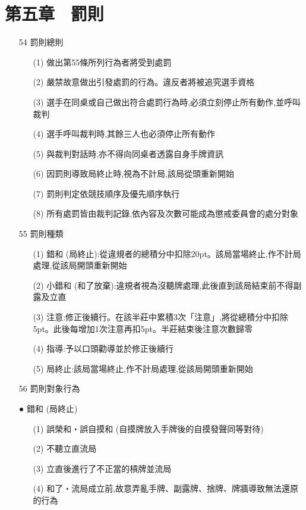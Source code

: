 \documentclass[a4paper,12pt]{article}
\begin{document}
\section*{第五章 \ 罰則}
\begin{itemize}
    \item[54] 罰則總則
    \begin{itemize}
        \item[(1)] 做出第55條所列行為者將受到處罰
        \item[(2)] 嚴禁故意做出引發處罰的行為。違反者將被追究選手資格
        \item[(3)] 選手在同桌或自己做出符合處罰行為時,必須立刻停止所有動作,並呼叫裁判
        \item[(4)] 選手呼叫裁判時,其餘三人也必須停止所有動作
        \item[(5)] 與裁判對話時,亦不得向同桌者透露自身手牌資訊
        \item[(6)] 因罰則導致局終止時,視為不計局,該局從頭重新開始
        \item[(7)] 罰則判定依競技順序及優先順序執行
        \item[(8)] 所有處罰皆由裁判記錄,依內容及次數可能成為懲戒委員會的處分對象
    \end{itemize}
    \item[55] 罰則種類
    \begin{itemize}
        \item[(1)] 錯和 (局終止):從違規者的總積分中扣除20pt。該局當場終止,作不計局處理,從該局開頭重新開始
        \item[(2)] 小錯和 (和了放棄):違規者視為沒聽牌處理,此後直到該局結束前不得副露及立直
        \item[(3)] 注意:修正後續行。在該半莊中累積3次「注意」,將從總積分中扣除5pt。此後每增加1次注意再扣5pt。半莊結束後注意次數歸零
        \item[(4)] 指導:予以口頭勸導並於修正後續行
        \item[(5)] 局終止:該局當場終止,作不計局處理,從該局開頭重新開始
    \end{itemize}
    \item[56] 罰則對象行為
    \item[●] 錯和 (局終止)
    \begin{itemize}
        \item[(1)] 誤榮和・誤自摸和 (自摸牌放入手牌後的自摸發聲同等對待)
        \item[(2)] 不聽立直流局
        \item[(3)] 立直後進行了不正當的槓牌並流局
        \item[(4)] 和了・流局成立前,故意弄亂手牌、副露牌、捨牌、牌牆導致無法還原的行為

\end{itemize}
\end{itemize}
\end{document}
